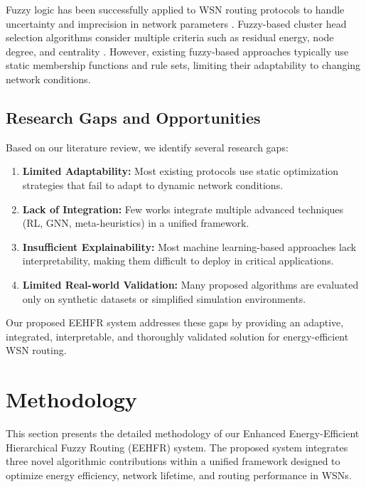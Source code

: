 \documentclass[conference]{IEEEtran}
\begin{document}
Fuzzy logic has been successfully applied to WSN routing protocols to handle uncertainty and imprecision in network parameters \cite{kim2008energy}. Fuzzy-based cluster head selection algorithms consider multiple criteria such as residual energy, node degree, and centrality \cite{bagci2013fuzzy}. However, existing fuzzy-based approaches typically use static membership functions and rule sets, limiting their adaptability to changing network conditions.

\subsection{Research Gaps and Opportunities}

Based on our literature review, we identify several research gaps:

\begin{enumerate}
    \item \textbf{Limited Adaptability:} Most existing protocols use static optimization strategies that fail to adapt to dynamic network conditions.
    
    \item \textbf{Lack of Integration:} Few works integrate multiple advanced techniques (RL, GNN, meta-heuristics) in a unified framework.
    
    \item \textbf{Insufficient Explainability:} Most machine learning-based approaches lack interpretability, making them difficult to deploy in critical applications.
    
    \item \textbf{Limited Real-world Validation:} Many proposed algorithms are evaluated only on synthetic datasets or simplified simulation environments.
\end{enumerate}

Our proposed EEHFR system addresses these gaps by providing an adaptive, integrated, interpretable, and thoroughly validated solution for energy-efficient WSN routing.



\section{Methodology}

This section presents the detailed methodology of our Enhanced Energy-Efficient Hierarchical Fuzzy Routing (EEHFR) system. The proposed system integrates three novel algorithmic contributions within a unified framework designed to optimize energy efficiency, network lifetime, and routing performance in WSNs.
\end{document}
